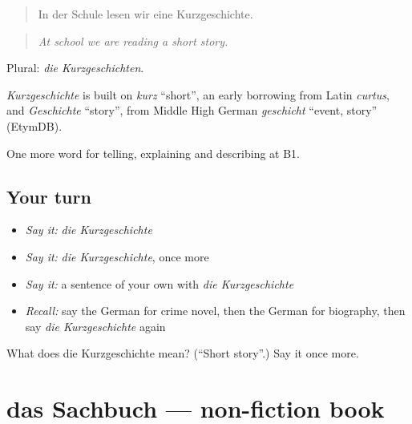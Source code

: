 \begin{quote}
In der Schule lesen wir eine Kurzgeschichte.
\end{quote}

\begin{quote}
\emph{At school we are reading a short story.}
\end{quote}

Plural: \emph{die Kurzgeschichten}.

\begin{cousinweb}
\emph{Kurzgeschichte} is built on \emph{kurz} \textquotedblleft{}short\textquotedblright{}, an early borrowing from Latin \emph{curtus}, and \emph{Geschichte} \textquotedblleft{}story\textquotedblright{}, from Middle High German \emph{geschicht} \textquotedblleft{}event, story\textquotedblright{} (EtymDB).
\end{cousinweb}

\begin{grammarlens}[title={What you've built}]
One more word for telling, explaining and describing at B1.
\end{grammarlens}

\subsection*{Your turn}
\begin{itemize}
\raggedright
  \item \emph{Say it:} \emph{die Kurzgeschichte}
  \item \emph{Say it:} \emph{die Kurzgeschichte}, once more
  \item \emph{Say it:} a sentence of your own with \emph{die Kurzgeschichte}
  \item \emph{Recall:} say the German for crime novel, then the German for biography, then say \emph{die Kurzgeschichte} again
\end{itemize}

\begin{tcolorbox}[breakable,colback=teal!4,colframe=teal!35!black,title={Before you move on}]
What does die Kurzgeschichte mean? (\textquotedblleft{}Short story\textquotedblright{}.) Say it once more.
\end{tcolorbox}
\section[das Sachbuch]{das Sachbuch — non-fiction book}

\label{lesson:GE-C520-sachbuch}



